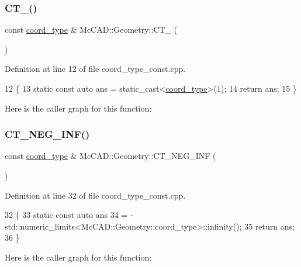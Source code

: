 \subsubsection{\texorpdfstring{C\+T\+\_()}{CT\_1()}}
{\footnotesize\ttfamily const \hyperlink{namespaceMcCAD_1_1Geometry_ac043b37a4a7e849fca22869e1982d2f8}{coord\+\_\+type} \& Mc\+C\+A\+D\+::\+Geometry\+::\+C\+T\+\_ (\begin{DoxyParamCaption}{ }\end{DoxyParamCaption})}



Definition at line 12 of file coord\+\_\+type\+\_\+const.\+cpp.


\begin{DoxyCode}
12                    \{
13     \textcolor{keyword}{static} \textcolor{keyword}{const} \textcolor{keyword}{auto} ans = \textcolor{keyword}{static\_cast<}\hyperlink{namespaceMcCAD_1_1Geometry_ac043b37a4a7e849fca22869e1982d2f8}{coord\_type}\textcolor{keyword}{>}(1);
14     \textcolor{keywordflow}{return} ans;
15 \}
\end{DoxyCode}
Here is the caller graph for this function\+:
\mbox{\label{namespaceMcCAD_1_1Geometry_a3d66ef52d0555244290d60a8bfa6d781}} 
\subsubsection{\texorpdfstring{C\+T\+\_\+\+N\+E\+G\+\_\+\+I\+N\+F()}{CT\_NEG\_INF()}}
{\footnotesize\ttfamily const \hyperlink{namespaceMcCAD_1_1Geometry_ac043b37a4a7e849fca22869e1982d2f8}{coord\+\_\+type} \& Mc\+C\+A\+D\+::\+Geometry\+::\+C\+T\+\_\+\+N\+E\+G\+\_\+\+I\+NF (\begin{DoxyParamCaption}{ }\end{DoxyParamCaption})}



Definition at line 32 of file coord\+\_\+type\+\_\+const.\+cpp.


\begin{DoxyCode}
32                          \{
33     \textcolor{keyword}{static} \textcolor{keyword}{const} \textcolor{keyword}{auto} ans
34             = -std::numeric\_limits<McCAD::Geometry::coord\_type>::infinity();
35     \textcolor{keywordflow}{return} ans;
36 \}
\end{DoxyCode}
Here is the caller graph for this function\+:
\mbox{\label{namespaceMcCAD_1_1Geometry_a7a1a1f1e3e0547cde4d81dec1a126c28}} 
